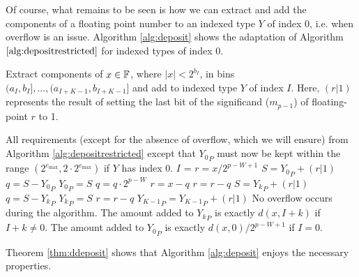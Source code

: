       Of course, what remains to be seen is how we can extract and add the components of a floating point number to an indexed type $Y$ of index 0, i.e. when overflow is an issue. Algorithm \ref{alg:deposit} shows the adaptation of Algorithm $\ref{alg:depositrestricted}$ for indexed types of index 0.

      \begin{samepage}
      \begin{alg}
        Extract components of $x \in \mathbb{F}$, where $|x| < 2^{b_I}$, in bins $(a_I, b_I], ..., (a_{I + K - 1}, b_{I + K - 1}]$ and add to indexed type $Y$ of index $I$. Here, $(r | 1)$ represents the result of setting the last bit of the significand ($m_{p - 1}$) of floating-point $r$ to 1.
        \begin{algorithmic}[1]
          \Require
            \Statex All requirements (except for the absence of overflow, which we will ensure) from Algorithm \ref{alg:depositrestricted} except that ${Y_0}_P$ must now be kept within the range $(2^{e_{\max}}, 2 \cdot 2^{e_{\max}})$ if $Y$ has index 0.
            \State $I$ = 
              \State $r = x / 2^{p - W + 1}$ \label{alg:deposit:scaler}
              \State $S = {Y_0}_P + (r | 1)$ \label{alg:deposit:formS}
              \State $q = S - {Y_0}_P$ \label{alg:deposit:formq}
              \State ${Y_0}_P = S$
              \State $q = q \cdot 2^{p - W}$ \label{alg:deposit:scaleq}
              \State $r = x - q$ \label{alg:deposit:formr}
              \State $r = r - q$ \label{alg:deposit:formragain}
                \State $S = {Y_k}_P + (r | 1)$
                \State $q = S - {Y_k}_P$
                \State ${Y_k}_P = S$
                \State $r = r - q$
              \EndFor
              \State ${Y_{K - 1}}_P = {Y_{K - 1}}_P + (r | 1)$
            \Else
              \State{} \label{alg:deposit:callrestricted}
            \EndIf
          \EndFunction
          \Ensure
            \Statex No overflow occurs during the algorithm.
            \Statex The amount added to ${Y_k}_P$ is exactly $d(x, I + k)$ if $I + k \neq 0$.
            \Statex The amount added to ${Y_0}_P$ is exactly $d(x, 0)/2^{p - W + 1}$ if $I = 0$.
        \end{algorithmic}
        \label{alg:deposit}
      \end{alg}
      \end{samepage}

      Theorem \ref{thm:ddeposit} shows that Algorithm \ref{alg:deposit} enjoys the necessary properties.

